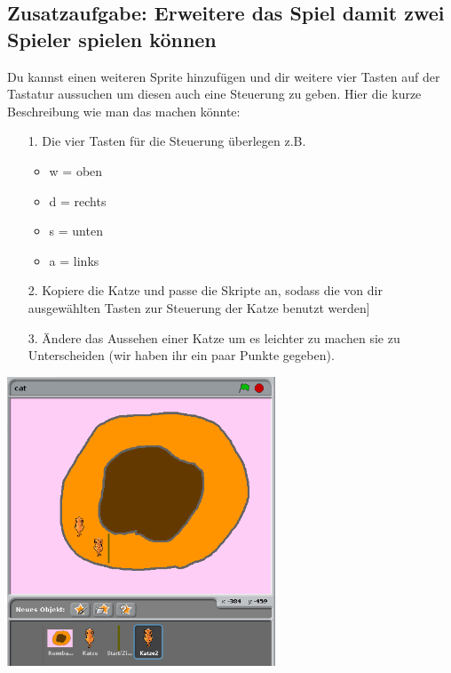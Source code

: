 \subsection{Zusatzaufgabe: Erweitere das Spiel damit zwei Spieler spielen k{\"o}nnen}
Du kannst einen weiteren Sprite hinzuf\"ugen und dir weitere vier Tasten auf der Tastatur aussuchen um diesen auch eine Steuerung zu geben. Hier die kurze Beschreibung wie man das machen k\"onnte:
\begin{itemize}
\item[1. ] Die vier Tasten f\"ur die Steuerung \"uberlegen z.B.
  \begin{itemize}
  \item w = oben
  \item d = rechts
  \item s = unten
  \item a = links
\end{itemize}
\item[2. ] Kopiere die Katze und passe die Skripte an, sodass die von dir ausgew\"ahlten Tasten zur Steuerung der Katze benutzt werden]
  \item[3. ] \"Andere das Aussehen einer Katze um es leichter zu machen sie zu Unterscheiden (wir haben ihr ein paar Punkte gegeben).
\end{itemize}
\includegraphics[width=0.6\textwidth]{images/aufgabe4_multiplayer.png}
